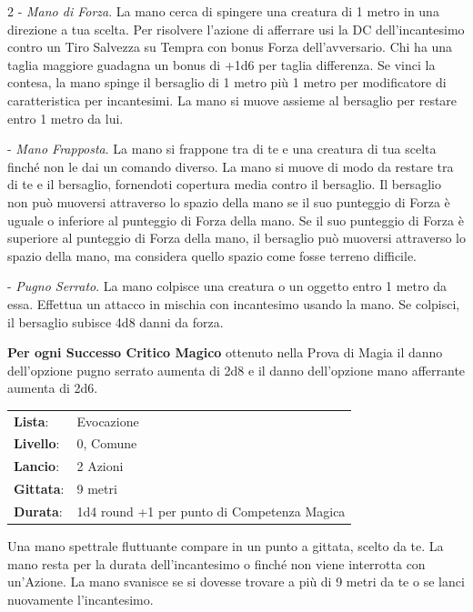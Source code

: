 \begin{multicols}{2}
- \emph{Mano di Forza}. La mano cerca di spingere una creatura di 1 metro in una direzione a tua scelta. Per risolvere l'azione di afferrare usi la DC dell'incantesimo contro un Tiro Salvezza su Tempra con bonus Forza dell'avversario. Chi ha una taglia maggiore guadagna un bonus di +1d6 per taglia differenza.
Se vinci la contesa, la mano spinge il bersaglio di 1 metro più 1 metro per modificatore di caratteristica per incantesimi. La mano si muove assieme al bersaglio per restare entro 1 metro da lui.

- \emph{Mano Frapposta}. La mano si frappone tra di te e una creatura di tua scelta finché non le dai un comando diverso. La mano si muove di modo da restare tra di te e il bersaglio, fornendoti copertura media contro il bersaglio. Il bersaglio non può muoversi attraverso lo spazio della mano se il suo punteggio di Forza è uguale o inferiore al punteggio di Forza della mano. Se il suo punteggio di Forza è superiore al punteggio di Forza della mano, il bersaglio può muoversi attraverso lo spazio della mano, ma considera quello spazio come fosse terreno difficile.

- \emph{Pugno Serrato}. La mano colpisce una creatura o un oggetto entro 1 metro da essa. Effettua un attacco in mischia con incantesimo usando la mano. Se colpisci, il bersaglio subisce 4d8 danni da forza.

\textbf{Per ogni Successo Critico Magico} ottenuto nella Prova di Magia il danno dell'opzione pugno serrato aumenta di 2d8 e il danno dell'opzione mano afferrante aumenta di 2d6.

\noindent\begin{tabularx}{\linewidth}{p{1.9cm}X}
	\rowcolor{gray!20}\textbf{Lista}: & Evocazione \\
	\textbf{Livello}: & 0, Comune \\
	\rowcolor{gray!20}\textbf{Lancio}: & 2 Azioni \\
	\textbf{Gittata}: & 9 metri \\
	\rowcolor{gray!20}\textbf{Durata}: & 1d4 round +1 per punto di Competenza Magica \\
\end{tabularx}\smallskip

Una mano spettrale fluttuante compare in un punto a gittata, scelto da te. La mano resta per la durata dell'incantesimo o finché non viene interrotta con un'Azione. La mano svanisce se si dovesse trovare a più di 9 metri da te o se lanci nuovamente l'incantesimo.


\end{multicols}
